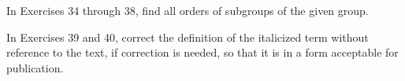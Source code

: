 \documentclass[11pt,oneside]{article}
\begin{document}
\begin{BookBody}
\noindent In Exercises 34 through 38, find all orders of subgroups of the given group.







\noindent In Exercises 39 and 40, correct the definition of the italicized term without reference to the text, if correction is needed, so that it is in a form acceptable for publication.



\end{BookBody}

\BookNarrativefalse
\end{document}
